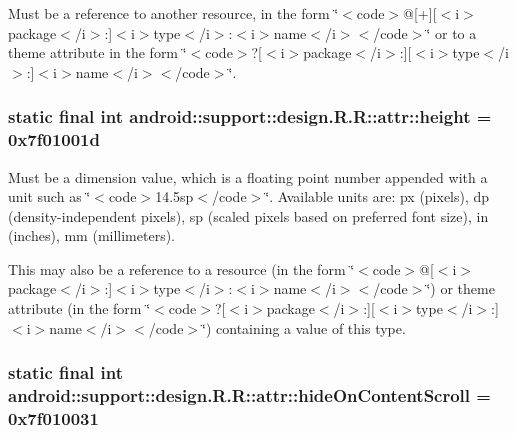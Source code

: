 Must be a reference to another resource, in the form \char`\"{}$<$code$>$@\mbox{[}+\mbox{]}\mbox{[}$<$i$>$package$<$/i$>$:\mbox{]}$<$i$>$type$<$/i$>$:$<$i$>$name$<$/i$>$$<$/code$>$\char`\"{} or to a theme attribute in the form \char`\"{}$<$code$>$?\mbox{[}$<$i$>$package$<$/i$>$:\mbox{]}\mbox{[}$<$i$>$type$<$/i$>$:\mbox{]}$<$i$>$name$<$/i$>$$<$/code$>$\char`\"{}. \hypertarget{classandroid_1_1support_1_1design_1_1_r_1_1attr_8f5b5a59c753574abfd259efc0f8e6b1}{
\subsubsection[{height}]{\setlength{\rightskip}{0pt plus 5cm}static final int android::support::design.R.R::attr::height = 0x7f01001d}}
\label{classandroid_1_1support_1_1design_1_1_r_1_1attr_8f5b5a59c753574abfd259efc0f8e6b1}


Must be a dimension value, which is a floating point number appended with a unit such as \char`\"{}$<$code$>$14.5sp$<$/code$>$\char`\"{}. Available units are: px (pixels), dp (density-independent pixels), sp (scaled pixels based on preferred font size), in (inches), mm (millimeters). 

This may also be a reference to a resource (in the form \char`\"{}$<$code$>$@\mbox{[}$<$i$>$package$<$/i$>$:\mbox{]}$<$i$>$type$<$/i$>$:$<$i$>$name$<$/i$>$$<$/code$>$\char`\"{}) or theme attribute (in the form \char`\"{}$<$code$>$?\mbox{[}$<$i$>$package$<$/i$>$:\mbox{]}\mbox{[}$<$i$>$type$<$/i$>$:\mbox{]}$<$i$>$name$<$/i$>$$<$/code$>$\char`\"{}) containing a value of this type. \hypertarget{classandroid_1_1support_1_1design_1_1_r_1_1attr_b5b372391ae7ad6af4ece46c09044e96}{
\subsubsection[{hideOnContentScroll}]{\setlength{\rightskip}{0pt plus 5cm}static final int android::support::design.R.R::attr::hideOnContentScroll = 0x7f010031}}
\label{classandroid_1_1support_1_1design_1_1_r_1_1attr_b5b372391ae7ad6af4ece46c09044e96}


